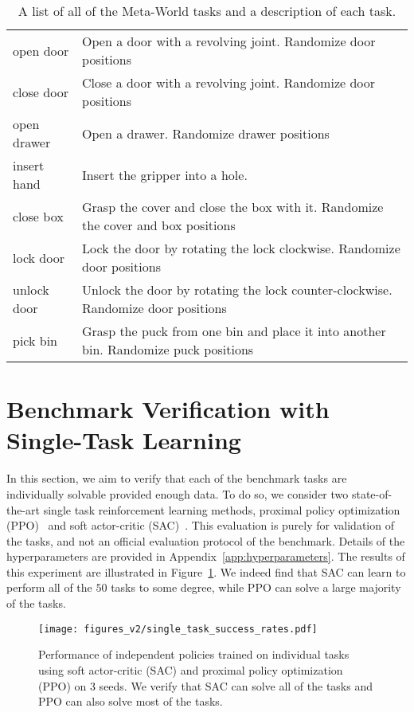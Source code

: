 \begin{table}[h]
\begin{tabular}{ll}
open door & Open a door with a revolving joint. Randomize door positions\\
close door & Close a door with a revolving joint. Randomize door positions\\
open drawer & Open a drawer. Randomize drawer positions\\
insert hand & Insert the gripper into a hole.\\
close box & Grasp the cover and close the box with it. Randomize the cover and box positions\\
lock door & Lock the door by rotating the lock clockwise. Randomize door positions\\
unlock door & Unlock the door by rotating the lock counter-clockwise. Randomize door positions\\
pick bin & Grasp the puck from one bin and place it into another bin. Randomize puck positions\\
\bottomrule
\end{tabular}
\vspace{0.2cm}
    \caption{A list of all of the Meta-World tasks and a description of each task.}
    \label{tbl:tasks}
\end{table}




\section{Benchmark Verification with Single-Task Learning}
\label{app:singletask}


In this section, we aim to verify that each of the benchmark tasks are individually solvable provided enough data. To do so, we consider two state-of-the-art single task reinforcement learning methods, proximal policy optimization (PPO)~\cite{schulman2017proximal} and soft actor-critic (SAC)~\cite{haarnoja2018soft}.
This evaluation is purely for validation of the tasks, and not an official evaluation protocol of the benchmark. Details of the hyperparameters are provided in Appendix~\ref{app:hyperparameters}.
The results of this experiment are illustrated in Figure~\ref{fig:single_task_results}. We indeed find that SAC can learn to perform all of the $50$ tasks to some degree, while PPO can solve a large majority of the tasks.

\begin{figure}[t]
    \centering
    \texttt{[image: figures\_v2/single\_task\_success\_rates.pdf]}
    \vspace{-1cm}
    \caption{Performance of independent policies trained on individual tasks using soft actor-critic (SAC) and proximal policy optimization (PPO) on 3 seeds. We verify that SAC can solve all of the tasks and PPO can also solve most of the tasks.}
    \vspace{-0.5cm}
    \label{fig:single_task_results}
\end{figure}

